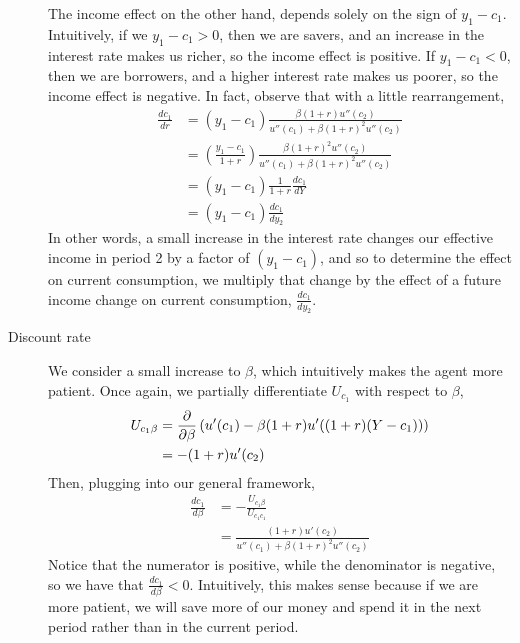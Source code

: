 \begin{description}
    The income effect on the other hand, depends solely on the sign of $y_1 - c_1$. Intuitively, if we $y_1 - c_1 > 0$, then we are savers, and an increase in the interest rate makes us richer, so the income effect is positive. If $y_1 - c_1 < 0$, then we are borrowers, and a higher interest rate makes us poorer, so the income effect is negative. In fact, observe that with a little rearrangement,
    \begin{align*}
        \frac{dc_1}{dr} &= (y_1 - c_1) \frac{\beta(1 + r) u''(c_2)}{u''(c_1) + \beta (1 + r)^2 u''(c_2)} \\
        &= \left(\frac{y_1 - c_1}{1 + r}\right) \frac{\beta(1 + r)^2 u''(c_2)}{u''(c_1) + \beta (1 + r)^2 u''(c_2)} \\
        &= (y_1 - c_1) \frac{1}{1 + r} \frac{dc_1}{dY} \\
        &= (y_1 - c_1) \frac{dc_1}{dy_2}
    \end{align*}
    In other words, a small increase in the interest rate changes our effective income in period 2 by a factor of $(y_1 - c_1)$, and so to determine the effect on current consumption, we multiply that change by the effect of a future income change on current consumption, $\frac{dc_1}{dy_2}$. 

    \item[Discount rate] We consider a small increase to $\beta$, which intuitively makes the agent more patient. Once again, we partially differentiate $U_{c_1}$ with respect to $\beta$,
    \begin{align*}
        U_{c_1 \beta} &= \frac{\partial }{\partial \beta} \left(u'(c_1) - \beta (1 + r) u'((1 + r)(Y - c_1))\right) \\
        &= -(1 + r) u'(c_2)
    \end{align*} 
    Then, plugging into our general framework,
    \begin{align*}
        \frac{dc_1}{d \beta} &= - \frac{U_{c_1 \beta} }{U_{c_1 c_1}} \\
        &= \frac{(1 + r)u'(c_2)}{u''(c_1) + \beta (1+r)^2 u''(c_2)}
    \end{align*}
    Notice that the numerator is positive, while the denominator is negative, so we have that $\frac{dc_1}{d\beta} < 0$. Intuitively, this makes sense because if we are more patient, we will save more of our money and spend it in the next period rather than in the current period. 
\end{description}